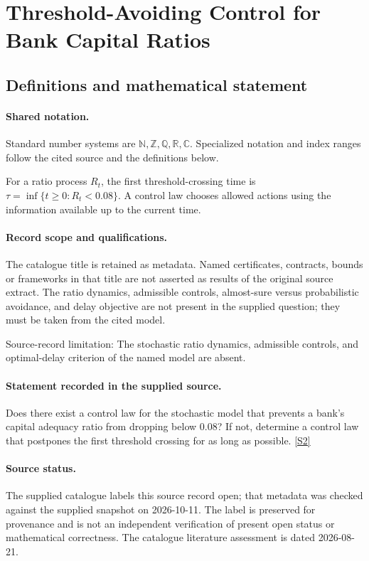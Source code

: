 \documentclass[11pt]{article}
\newcommand{\sref}[2]{\hyperlink{source:#1:#2}{[S#2]}}
\begin{document}
\section{Threshold-Avoiding Control for Bank Capital Ratios}\label{statement}

\subsection{Definitions and mathematical statement}

\paragraph{Shared notation.}Standard number systems are $\mathbb N,\mathbb Z,\mathbb Q,\mathbb R,\mathbb C$. Specialized notation and index ranges follow the cited source and the definitions below.


For a ratio process $R_t$, the first threshold-crossing time is $\tau=\inf\{t\geq0:R_t<0.08\}$. A control law chooses allowed actions using the information available up to the current time.
\paragraph{Record scope and qualifications.}
The catalogue title is retained as metadata. Named certificates, contracts, bounds or frameworks in that title are not asserted as results of the original source extract.
The ratio dynamics, admissible controls, almost-sure versus probabilistic avoidance, and delay objective are not present in the supplied question; they must be taken from the cited model.

Source-record limitation: The stochastic ratio dynamics, admissible controls, and optimal-delay criterion of the named model are absent.
\paragraph{Statement recorded in the supplied source.}
Does there exist a control law for the stochastic model that prevents a bank's capital adequacy ratio from dropping below $0.08$? If not, determine a control law that postpones the first threshold crossing for as long as possible. \sref{statement}{2}
\paragraph{Source status.}
The supplied catalogue labels this source record open; that metadata was checked against the supplied snapshot on 2026-10-11. The label is preserved for provenance and is not an independent verification of present open status or mathematical correctness. The catalogue literature assessment is dated 2026-08-21.
\end{document}
